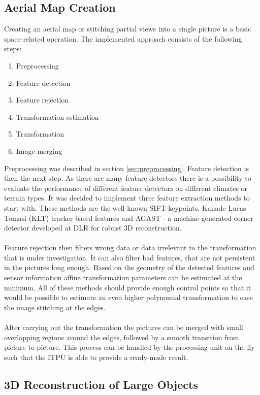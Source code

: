 \subsection{Aerial Map Creation}

Creating an aerial map or stitching partial views into a single picture is a basic space-related operation. The implemented approach consists of the following steps:

\begin{enumerate}
\item Preprocessing
\item Feature detection
\item Feature rejection
\item Transformation estimation
\item Transformation
\item Image merging
\end{enumerate}

\noindent
Preprocessing was described in section \ref{sec:preprocessing}. Feature detection is then the next step. As there
are many feature detectors there is a possibility to evaluate the performance of different feature detectors on different
climates or terrain types. It was decided to implement three feature extraction methods to start with. These methods are the well-known SIFT keypoints, Kanade Lucas Tomasi (KLT) tracker based features and AGAST - a machine-generated corner detector developed at DLR for robust 3D reconstruction.
\\
\\
Feature rejection then filters wrong data or data irrelevant to the transformation that is under investigation. It can also filter bad features, that are not persistent in the pictures long enough. Based on the geometry of the detected features and sensor information affine transformation parameters can be estimated at the minimum. All of these methods should provide enough control points so that it would be possible to estimate an even higher polynomial transformation to ease the image stitching at the edges.
\\
\\
After carrying out the transformation the pictures can be merged with small overlapping regions around the edges, followed by a smooth transition from picture to picture. This process can be handled by the processing unit on-the-fly such that the \ac{ITPU} is able to provide a ready-made result.

\subsection{3D Reconstruction of Large Objects}


